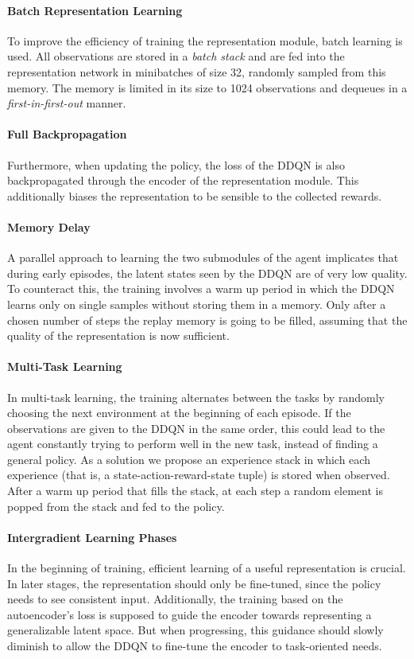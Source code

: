 \paragraph{Batch Representation Learning} To improve the efficiency of training the representation module, batch learning is used. All observations are stored in a \textit{batch stack} and are fed into the representation network in minibatches of size 32, randomly sampled from this memory. The memory is limited in its size to 1024 observations and dequeues in a \textit{first-in-first-out} manner.

\paragraph{Full Backpropagation} Furthermore, when updating the policy, the loss of the DDQN is also backpropagated through the encoder of the representation module. This additionally biases the representation to be sensible to the collected rewards.\\

\paragraph{Memory Delay} A parallel approach to learning the two submodules of the agent implicates that during early episodes, the latent states seen by the DDQN are of very low quality. To counteract this, the training involves a warm up period in which the DDQN learns only on single samples without storing them in a memory. Only after a chosen number of steps the replay memory is going to be filled, assuming that the quality of the representation is now sufficient.

\paragraph{Multi-Task Learning} In multi-task learning, the training alternates between the tasks by randomly choosing the next environment at the beginning of each episode. If the observations are given to the DDQN in the same order, this could lead to the agent constantly trying to perform well in the new task, instead of finding a general policy. As a solution we propose an experience stack in which each experience (that is, a state-action-reward-state tuple) is stored when observed. After a warm up period that fills the stack, at each step a random element is popped from the stack and fed to the policy.

\paragraph{Intergradient Learning Phases} In the beginning of training, efficient learning of a useful representation is crucial. In later stages, the representation should only be fine-tuned, since the policy needs to see consistent input. Additionally, the training based on the autoencoder's loss is supposed to guide the encoder towards representing a generalizable latent space. But when progressing, this guidance should slowly diminish to allow the DDQN to fine-tune the encoder to task-oriented needs. 

